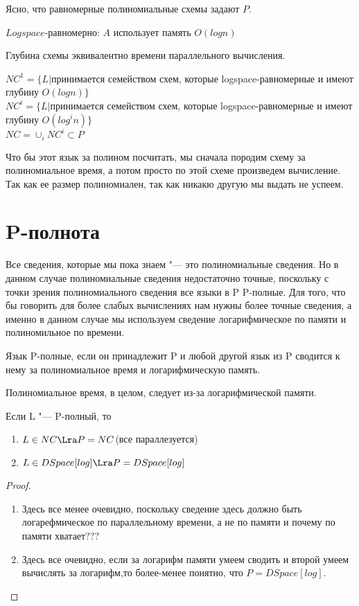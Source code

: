 Ясно, что равномерные полиномиальные схемы задают $P$.
 
\begin{Def}
$Logspace$-равномерно: $A$ использует память $O(log n)$ \\
\end{Def}

\begin{Def}
Глубина схемы эквивалентно времени параллельного вычисления. 
\end{Def}

\begin{Def}
$NC^1 = \{L|$принимается семейством схем,
которые logspace-равномерные и имеют глубину $O(log n) \}$
\\
$NC^i = \{L|$принимается семейством схем,
которые logspace-равномерные и имеют глубину $O(log^i n) \}$
\\
$NC = \cup_{i} NC^i \subset P$\\
\end{Def}
Что бы этот язык за полином посчитать, мы сначала породим 
схему за полиномиальное время, а потом просто 
по этой схеме произведем вычисление. Так как ее размер полиномиален, 
так как никакю другую мы выдать не успеем. 

\section{P-полнота}

Все сведения, которые мы пока знаем "--- это 
полиномиальные сведения. Но в данном случае 
полиномиальные сведения недостаточно точные, поскольку 
с точки зрения полиномиального сведения все языки в P
P-полные. Для того, что бы говорить для более слабых 
вычислениях нам нужны более точные сведения, а именно
в данном случае мы используем сведение логарифмическое по 
памяти и полиномильное по времени. 
\begin{Def}
Язык P-полные, если он принадлежит P и 
любой другой язык из P сводится к нему 
за полиномиальное время и логарифмическую память. 

Полиномиальное время, в целом, следует из-за 
логарифмической памяти. 
\end{Def}

\begin{theorem}
Если L "--- P-полный, то 
    \begin{enumerate}
     \item  $L \in NC \Lra P = NC$(все параллезуется)
     \item  $L \in DSpace[log] \Lra P = DSpace[log]$
    \end{enumerate}
\end{theorem}
\begin{proof}
\begin{enumerate}
\item Здесь все менее очевидно, поскольку 
сведение здесь должно быть логарефмическое по параллельному 
времени, а не по памяти и почему по памяти хватает???
\item Здесь все очевидно, если за логарифм памяти умеем 
сводить и второй умеем вычислять за логарифм,то более-менее понятно, 
что $P = DSpace[log]$.
\end{enumerate}
\end{proof}

